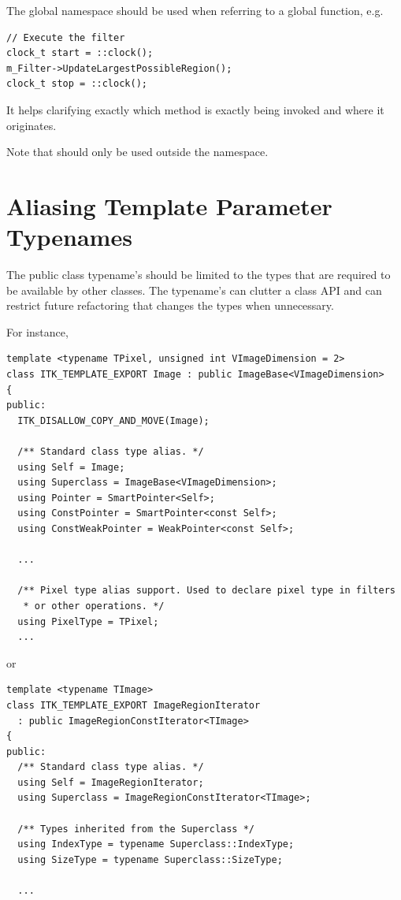 The \code{::} global namespace should be used when referring to a global
function, e.g.

\small
\begin{verbatim}
// Execute the filter
clock_t start = ::clock();
m_Filter->UpdateLargestPossibleRegion();
clock_t stop = ::clock();
\end{verbatim}
\normalsize

It helps clarifying exactly which method is exactly being invoked and where it
originates.

Note that  should only be used outside the  namespace.


\section{Aliasing Template Parameter Typenames}%
\label{sec:AliasingTemplateParameterTypenames}

The public class typename's should be limited to the types that are required to
be available by other classes. The typename's can clutter a class API and can
restrict future refactoring that changes the types when unnecessary.

For instance,

\small
\begin{verbatim}
template <typename TPixel, unsigned int VImageDimension = 2>
class ITK_TEMPLATE_EXPORT Image : public ImageBase<VImageDimension>
{
public:
  ITK_DISALLOW_COPY_AND_MOVE(Image);

  /** Standard class type alias. */
  using Self = Image;
  using Superclass = ImageBase<VImageDimension>;
  using Pointer = SmartPointer<Self>;
  using ConstPointer = SmartPointer<const Self>;
  using ConstWeakPointer = WeakPointer<const Self>;

  ...

  /** Pixel type alias support. Used to declare pixel type in filters
   * or other operations. */
  using PixelType = TPixel;
  ...
\end{verbatim}
\normalsize

or

\small
\begin{verbatim}
template <typename TImage>
class ITK_TEMPLATE_EXPORT ImageRegionIterator
  : public ImageRegionConstIterator<TImage>
{
public:
  /** Standard class type alias. */
  using Self = ImageRegionIterator;
  using Superclass = ImageRegionConstIterator<TImage>;

  /** Types inherited from the Superclass */
  using IndexType = typename Superclass::IndexType;
  using SizeType = typename Superclass::SizeType;

  ...
\end{verbatim}
\normalsize


